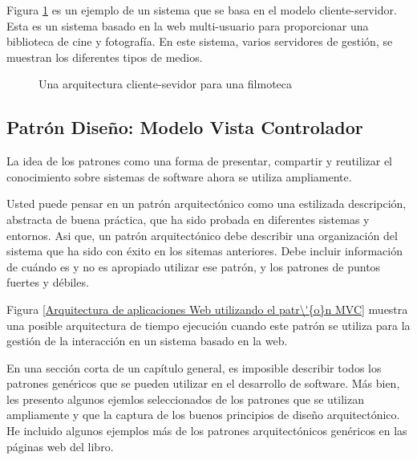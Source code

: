 Figura \ref{Una arquitectura cliente-sevidor para una filmoteca} es un ejemplo de
un sistema que se basa en el modelo cliente-servidor. Esta es un sistema basado en
la web multi-usuario para proporcionar una biblioteca de cine y  fotograf\'{i}a.
En este sistema, varios servidores de gesti\'{o}n, se muestran los diferentes tipos de
medios.\cite{sommerville2011software}

\begin{figure}[!htb]
	\centering
	\caption{Una arquitectura cliente-sevidor para una filmoteca}
	\label{Una arquitectura cliente-sevidor para una filmoteca}
\end{figure}

\subsection{Patr\'{o}n Dise\~{n}o: Modelo Vista Controlador}

La idea de los patrones como una forma de presentar, compartir y reutilizar el
conocimiento sobre sistemas de software ahora se utiliza ampliamente.

Usted puede pensar en un patr\'{o}n arquitect\'{o}nico como una estilizada 
descripci\'{o}n, abstracta de buena pr\'{a}ctica, que ha sido probada en 
diferentes sistemas y entornos. Asi que, un patr\'{o}n arquitect\'{o}nico
debe describir una organizaci\'{o}n del sistema que ha sido con \'{e}xito
en los sitemas anteriores. Debe incluir informaci\'{o}n de cu\'{a}ndo es
y no es apropiado utilizar ese patr\'{o}n, y los patrones de puntos fuertes
y d\'{e}biles.

Figura \ref{Arquitectura de aplicaciones Web utilizando el patr\'{o}n MVC} muestra
una posible arquitectura de tiempo ejecuci\'{o}n cuando este patr\'{o}n se utiliza
para la gesti\'{o}n de la interacci\'{o}n en un sistema basado en la web.

En una secci\'{o}n corta de un cap\'{i}tulo general, es imposible describir todos
los patrones gen\'{e}ricos que se pueden utilizar en el desarrollo de software.
M\'{a}s bien, les presento algunos ejemlos seleccionados de los patrones que se
utilizan ampliamente y que la captura de los buenos principios de dise\~{n}o 
arquitect\'{o}nico. He incluido algunos ejemplos m\'{a}s de los patrones 
arquitect\'{o}nicos gen\'{e}ricos en las p\'{a}ginas web del libro.
\cite{sommerville2011software}

\begin{minipage}{1.0\textwidth}
	\centering
	\label{Arquitectura de aplicaciones Web utilizando el patr\'{o}n MVC}
\end{minipage}

